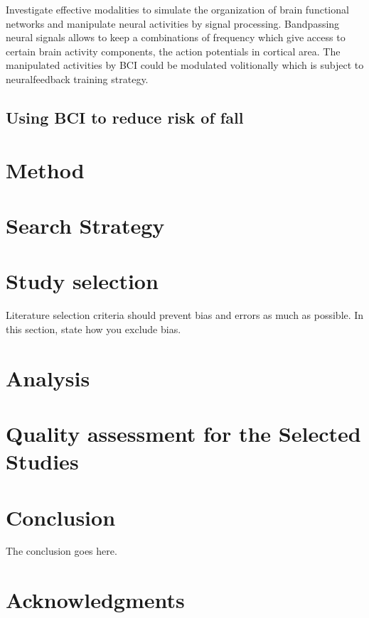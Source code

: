 \documentclass[conference,compsoc]{IEEEtran}
\begin{document}
Investigate effective modalities to simulate the organization 
of brain functional networks and manipulate neural activities by signal processing. Bandpassing neural signals allows to keep a combinations of frequency which give access to certain brain activity components, the action potentials in cortical area. The manipulated activities by BCI 
could be modulated volitionally which is subject to neuralfeedback training strategy.

\subsection{Using BCI to reduce risk of fall}

\section{Method}
\section{Search Strategy}
\section{Study selection}
Literature selection criteria should prevent bias and errors as much as possible. In this section, state how you exclude bias.
\section{Analysis}

\section{Quality assessment for the Selected Studies}





\section{Conclusion}
The conclusion goes here.







\ifCLASSOPTIONcompsoc
  \section*{Acknowledgments}
\else
\end{document}
